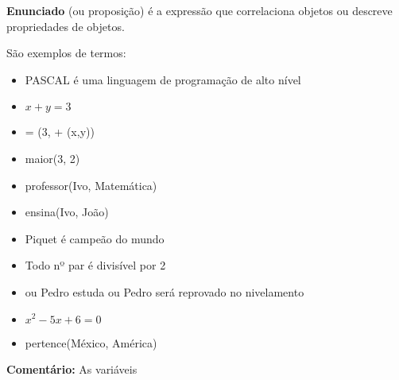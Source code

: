 \documentclass[
	14pt,				%
	twoside,			%
	a4paper,			%
	english,			%
	french,				%
	spanish,			%
	brazil,				%
    ]{abntex2}
\begin{document}
\vskip 0.5cm

\begin{addmargin}[2.0cm]{0cm}
\textbf{Enunciado} (ou proposição) é a expressão que correlaciona objetos ou descreve propriedades de objetos.
\end{addmargin}

\vskip 0.5cm

\noindent São exemplos de termos:

\begin{itemize}[itemsep=0.01pt]
\renewcommand\labelitemi{\textbf{-}}
    \item PASCAL é uma linguagem de programação de alto nível
    \item $x + y = 3$
    \item  = (3, + (x,y))
    \item  maior(3, 2)
    \item professor(Ivo, Matemática)
    \item ensina(Ivo, João)
    \item Piquet é campeão do mundo
    \item Todo nº par é divisível por 2
    \item ou Pedro estuda ou Pedro será reprovado no nivelamento
    \item $x^2 - 5x + 6 = 0$
    \item pertence(México, América)
\end{itemize}

\textbf{Comentário:} As variáveis \lipsum[5]

\newpage
\end{document}
